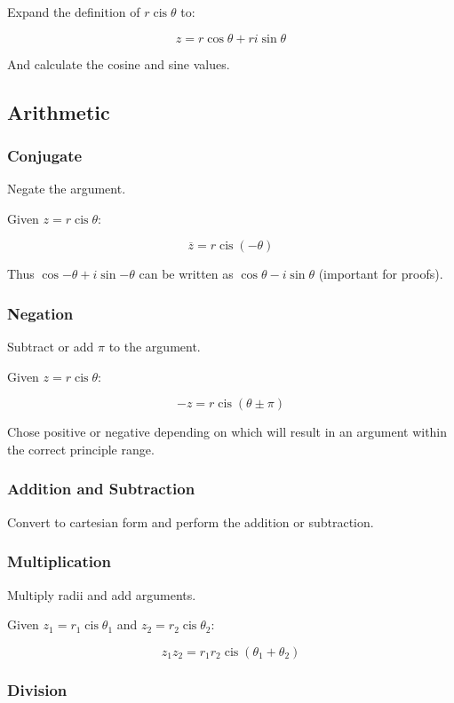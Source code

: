 \documentclass[a4paper,11pt]{article}
\DeclareMathOperator\cis{cis}
\begin{document}
Expand the definition of $r \cis{\theta}$ to:

$$
z = r \cos{\theta} + ri\sin{\theta}
$$

And calculate the cosine and sine values.


\subsection{Arithmetic}

\subsubsection{Conjugate}

Negate the argument.

Given $z = r \cis{\theta}$:

$$
\overline{z} = r \cis(-\theta)
$$

Thus $\cos{-\theta} + i\sin{-\theta}$ can be written as
$\cos{\theta} - i\sin{\theta}$ (important for proofs).


\subsubsection{Negation}

Subtract or add $\pi$ to the argument.

Given $z = r \cis{\theta}$:

$$
-z = r \cis(\theta \pm \pi)
$$

Chose positive or negative depending on which will result in an argument within
the correct principle range.


\subsubsection{Addition and Subtraction}

Convert to cartesian form and perform the addition or subtraction.


\subsubsection{Multiplication}

Multiply radii and add arguments.

Given $z_1 = r_1 \cis{\theta_1}$ and $z_2 = r_2 \cis{\theta_2}$:

$$
z_1 z_2 = r_1 r_2 \cis(\theta_1 + \theta_2)
$$


\subsubsection{Division}
\end{document}

